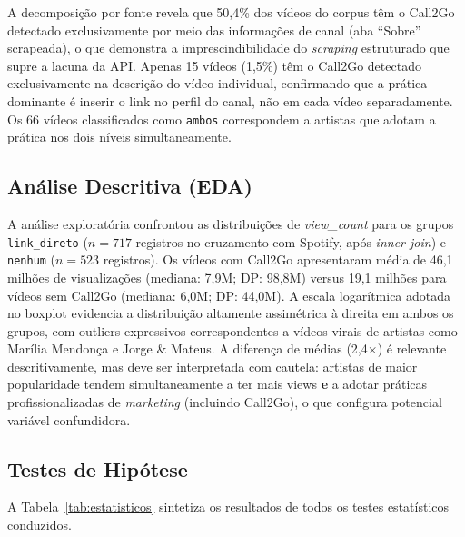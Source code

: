 \documentclass[12pt, a4paper]{article}
\begin{document}
A decomposição por fonte revela que 50,4\% dos vídeos do corpus têm o Call2Go detectado exclusivamente por meio das informações de canal (aba ``Sobre'' scrapeada), o que demonstra a imprescindibilidade do \textit{scraping} estruturado que supre a lacuna da API. Apenas 15 vídeos (1,5\%) têm o Call2Go detectado exclusivamente na descrição do vídeo individual, confirmando que a prática dominante é inserir o link no perfil do canal, não em cada vídeo separadamente. Os 66 vídeos classificados como \texttt{ambos} correspondem a artistas que adotam a prática nos dois níveis simultaneamente.

\subsection{Análise Descritiva (EDA)}

A análise exploratória confrontou as distribuições de \textit{view\_count} para os grupos \texttt{link\_direto} ($n = 717$ registros no cruzamento com Spotify, após \textit{inner join}) e \texttt{nenhum} ($n = 523$ registros). Os vídeos com Call2Go apresentaram média de 46,1 milhões de visualizações (mediana: 7,9M; DP: 98,8M) versus 19,1 milhões para vídeos sem Call2Go (mediana: 6,0M; DP: 44,0M). A escala logarítmica adotada no boxplot evidencia a distribuição altamente assimétrica à direita em ambos os grupos, com outliers expressivos correspondentes a vídeos virais de artistas como Marília Mendonça e Jorge \& Mateus. A diferença de médias (2,4$\times$) é relevante descritivamente, mas deve ser interpretada com cautela: artistas de maior popularidade tendem simultaneamente a ter mais views \textbf{e} a adotar práticas profissionalizadas de \textit{marketing} (incluindo Call2Go), o que configura potencial variável confundidora.

\subsection{Testes de Hipótese}

A Tabela~\ref{tab:estatisticos} sintetiza os resultados de todos os testes estatísticos conduzidos.
\end{document}
